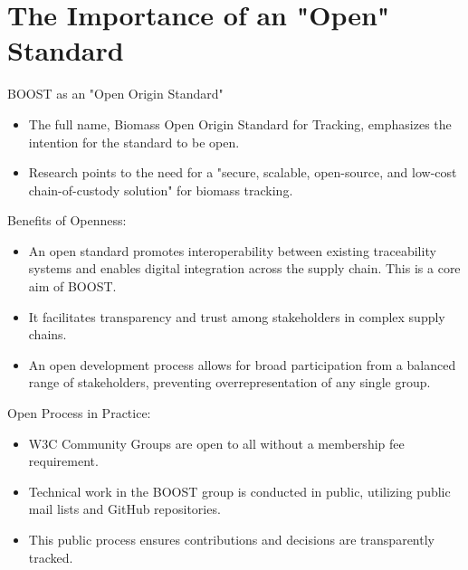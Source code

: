 \documentclass[presentation]{beamer}
\begin{document}
\section{The Importance of an "Open" Standard}
\label{the-importance-of-an-open-standard}
\begin{frame}[label={sec:org8058386}]{BOOST as an "Open Origin Standard"}
\begin{itemize}
\item The full name, Biomass \alert{Open} Origin Standard for Tracking, emphasizes the intention for the standard to be open.
\item Research points to the need for a "secure, scalable, \alert{open-source}, and low-cost chain-of-custody solution" for biomass tracking.
\end{itemize}
\end{frame}
\begin{frame}[label={sec:orgba3325a}]{Benefits of Openness:}
\begin{itemize}
\item An open standard promotes \alert{interoperability} between existing traceability systems and enables digital integration across the supply chain. This is a core aim of BOOST.
\item It facilitates \alert{transparency} and \alert{trust} among stakeholders in complex supply chains.
\item An open development process allows for \alert{broad participation} from a balanced range of stakeholders, preventing overrepresentation of any single group.
\end{itemize}
\end{frame}
\begin{frame}[label={sec:orge563c0e}]{Open Process in Practice:}
\begin{itemize}
\item W3C Community Groups are \alert{open to all} without a membership fee requirement.
\item Technical work in the BOOST group is conducted \alert{in public}, utilizing public mail lists and GitHub repositories.
\item This public process ensures contributions and decisions are transparently tracked.
\end{itemize}
\end{frame}
\end{document}
